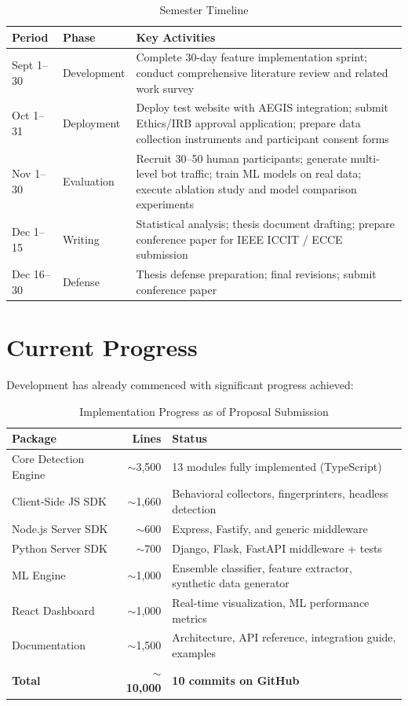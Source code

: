 \documentclass[12pt, a4paper]{article}
\begin{document}
\begin{table}[H]
\centering
\caption{Semester Timeline}
\small
\begin{tabularx}{\textwidth}{@{}l l X@{}}
\toprule
\textbf{Period} & \textbf{Phase} & \textbf{Key Activities} \\
\midrule
Sept 1--30 & Development & Complete 30-day feature implementation sprint; conduct comprehensive literature review and related work survey \\[3pt]
Oct 1--31 & Deployment & Deploy test website with AEGIS integration; submit Ethics/IRB approval application; prepare data collection instruments and participant consent forms \\[3pt]
Nov 1--30 & Evaluation & Recruit 30--50 human participants; generate multi-level bot traffic; train ML models on real data; execute ablation study and model comparison experiments \\[3pt]
Dec 1--15 & Writing & Statistical analysis; thesis document drafting; prepare conference paper for IEEE ICCIT / ECCE submission \\[3pt]
Dec 16--30 & Defense & Thesis defense preparation; final revisions; submit conference paper \\
\bottomrule
\end{tabularx}
\end{table}

\section{Current Progress}

Development has already commenced with significant progress achieved:

\begin{table}[H]
\centering
\caption{Implementation Progress as of Proposal Submission}
\small
\begin{tabularx}{\textwidth}{@{}l r X@{}}
\toprule
\textbf{Package} & \textbf{Lines} & \textbf{Status} \\
\midrule
Core Detection Engine & $\sim$3,500 & 13 modules fully implemented (TypeScript) \\
Client-Side JS SDK & $\sim$1,660 & Behavioral collectors, fingerprinters, headless detection \\
Node.js Server SDK & $\sim$600 & Express, Fastify, and generic middleware \\
Python Server SDK & $\sim$700 & Django, Flask, FastAPI middleware + tests \\
ML Engine & $\sim$1,000 & Ensemble classifier, feature extractor, synthetic data generator \\
React Dashboard & $\sim$1,000 & Real-time visualization, ML performance metrics \\
Documentation & $\sim$1,500 & Architecture, API reference, integration guide, examples \\
\midrule
\textbf{Total} & \textbf{$\sim$10,000} & \textbf{10 commits on GitHub} \\
\bottomrule
\end{tabularx}
\end{table}
\end{document}
